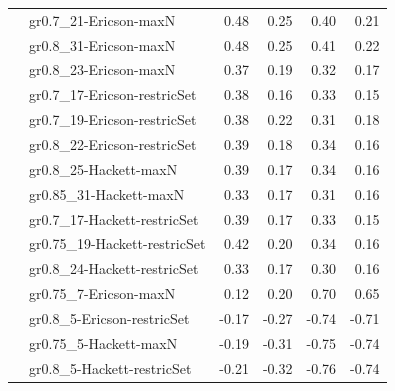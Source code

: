 {\begin{landscape}
\begin{footnotesize}
\begin{longtable}{@{}ll|rrrr@{}}
\addlinespace
\multirow{11}{*}{EMR} & gr0.7\_21-Ericson-maxN & 0.48 & 0.25 & 0.40 & 0.21 \\
 & gr0.8\_31-Ericson-maxN & 0.48 & 0.25 & 0.41 & 0.22 \\
 & gr0.8\_23-Ericson-maxN & 0.37 & 0.19 & 0.32 & 0.17 \\
 & gr0.7\_17-Ericson-restricSet & 0.38 & 0.16 & 0.33 & 0.15 \\
 & gr0.7\_19-Ericson-restricSet & 0.38 & 0.22 & 0.31 & 0.18 \\
 & gr0.8\_22-Ericson-restricSet & 0.39 & 0.18 & 0.34 & 0.16 \\
 & gr0.8\_25-Hackett-maxN & 0.39 & 0.17 & 0.34 & 0.16 \\
 & gr0.85\_31-Hackett-maxN & 0.33 & 0.17 & 0.31 & 0.16 \\
 & gr0.7\_17-Hackett-restricSet & 0.39 & 0.17 & 0.33 & 0.15 \\
 & gr0.75\_19-Hackett-restricSet & 0.42 & 0.20 & 0.34 & 0.16 \\
 & gr0.8\_24-Hackett-restricSet & 0.33 & 0.17 & 0.30 & 0.16 \\
\addlinespace
\multirow{4}{*}{PEP} & gr0.75\_7-Ericson-maxN & 0.12 & 0.20 & 0.70 & 0.65 \\
 & gr0.8\_5-Ericson-restricSet & -0.17 & -0.27 & -0.74 & -0.71 \\
 & gr0.75\_5-Hackett-maxN & -0.19 & -0.31 & -0.75 & -0.74 \\
 & gr0.8\_5-Hackett-restricSet & -0.21 & -0.32 & -0.76 & -0.74 \\
\bottomrule
\end{longtable}
\end{footnotesize}
\end{landscape}
\clearpage%
}


